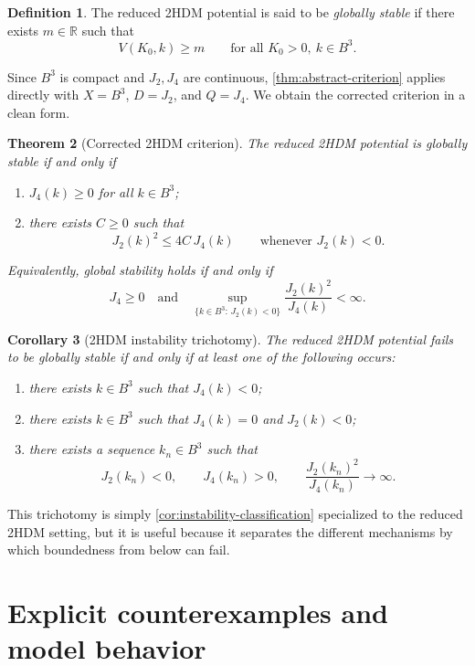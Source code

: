 \documentclass[11pt,a4paper]{article}
\newtheorem{theorem}{Theorem}[section]
\newtheorem{corollary}[theorem]{Corollary}
\theoremstyle{definition}
\newtheorem{definition}[theorem]{Definition}
\theoremstyle{remark}
\begin{document}
\begin{definition}\label{def:global-stability-2hdm}
The reduced 2HDM potential is said to be \emph{globally stable} if there exists $m\in\mathbb{R}$ such that
\[
V(K_0,k)\ge m
\qquad\text{for all }K_0>0,\ k\in B^3.
\]
\end{definition}

Since $B^3$ is compact and $J_2,J_4$ are continuous, \cref{thm:abstract-criterion} applies directly with $X=B^3$, $D=J_2$, and $Q=J_4$. We obtain the corrected criterion in a clean form.

\begin{theorem}[Corrected 2HDM criterion]\label{thm:2hdm-criterion}
The reduced 2HDM potential is globally stable if and only if
\begin{enumerate}[label=(\arabic*)]
  \item $J_4(k)\ge0$ for all $k\in B^3$;
  \item there exists $C\ge0$ such that
  \[
  J_2(k)^2\le 4C\,J_4(k)
  \qquad\text{whenever }J_2(k)<0.
  \]
\end{enumerate}
Equivalently, global stability holds if and only if
\[
J_4\ge0
\quad\text{and}\quad
\sup_{\{k\in B^3:\,J_2(k)<0\}}\frac{J_2(k)^2}{J_4(k)}<\infty.
\]
\end{theorem}

\begin{corollary}[2HDM instability trichotomy]\label{cor:2hdm-instability-trichotomy}
The reduced 2HDM potential fails to be globally stable if and only if at least one of the following occurs:
\begin{enumerate}[label=(\arabic*)]
  \item there exists $k\in B^3$ such that $J_4(k)<0$;
  \item there exists $k\in B^3$ such that $J_4(k)=0$ and $J_2(k)<0$;
  \item there exists a sequence $k_n\in B^3$ such that
  \[
  J_2(k_n)<0,\qquad J_4(k_n)>0,\qquad \frac{J_2(k_n)^2}{J_4(k_n)}\to\infty.
  \]
\end{enumerate}
\end{corollary}

This trichotomy is simply \cref{cor:instability-classification} specialized to the reduced 2HDM setting, but it is useful because it separates the different mechanisms by which boundedness from below can fail.

\section{Explicit counterexamples and model behavior}
\end{document}
